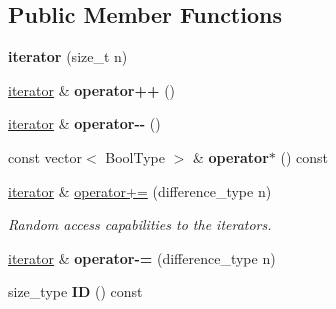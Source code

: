 \subsection*{Public Member Functions}
\begin{DoxyCompactItemize}
\item 
\hypertarget{classdscr_1_1basic__subsets_1_1iterator_a1ef45fec843ae0c298080ef1827a1e9d}{{\bfseries iterator} (size\-\_\-t n)}\label{classdscr_1_1basic__subsets_1_1iterator_a1ef45fec843ae0c298080ef1827a1e9d}

\item 
\hypertarget{classdscr_1_1basic__subsets_1_1iterator_ae7acb9cf5aad999dceba4e56aba024ca}{\hyperlink{classdscr_1_1basic__subsets_1_1iterator}{iterator} \& {\bfseries operator++} ()}\label{classdscr_1_1basic__subsets_1_1iterator_ae7acb9cf5aad999dceba4e56aba024ca}

\item 
\hypertarget{classdscr_1_1basic__subsets_1_1iterator_a5d0bd6baa7fba5ea9d141f658da0eb0f}{\hyperlink{classdscr_1_1basic__subsets_1_1iterator}{iterator} \& {\bfseries operator-\/-\/} ()}\label{classdscr_1_1basic__subsets_1_1iterator_a5d0bd6baa7fba5ea9d141f658da0eb0f}

\item 
\hypertarget{classdscr_1_1basic__subsets_1_1iterator_a90673aefa67ab5ef3bba771208d0642b}{const vector$<$ Bool\-Type $>$ \& {\bfseries operator$\ast$} () const }\label{classdscr_1_1basic__subsets_1_1iterator_a90673aefa67ab5ef3bba771208d0642b}

\item 
\hyperlink{classdscr_1_1basic__subsets_1_1iterator}{iterator} \& \hyperlink{classdscr_1_1basic__subsets_1_1iterator_ac67f07763f7f4e95dbeb056af75ccc6d}{operator+=} (difference\-\_\-type n)
\begin{DoxyCompactList}\small\item\em Random access capabilities to the iterators. \end{DoxyCompactList}\item 
\hypertarget{classdscr_1_1basic__subsets_1_1iterator_a23e311a6c5505bf8a61635e79d1a173d}{\hyperlink{classdscr_1_1basic__subsets_1_1iterator}{iterator} \& {\bfseries operator-\/=} (difference\-\_\-type n)}\label{classdscr_1_1basic__subsets_1_1iterator_a23e311a6c5505bf8a61635e79d1a173d}

\item 
\hypertarget{classdscr_1_1basic__subsets_1_1iterator_ae6ae9eb08d7574dda97f63f330f6dc95}{size\-\_\-type {\bfseries I\-D} () const }\label{classdscr_1_1basic__subsets_1_1iterator_ae6ae9eb08d7574dda97f63f330f6dc95}


\end{DoxyCompactItemize}
